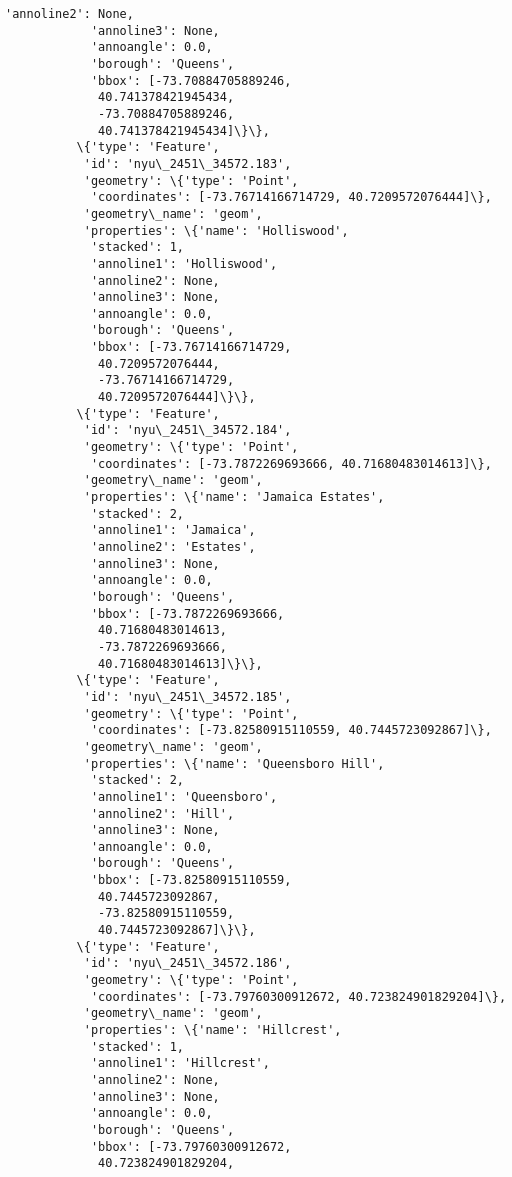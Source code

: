 \documentclass[11pt]{article}
\begin{document}
\begin{Verbatim}[commandchars=\\\{\}]
            'annoline2': None,
            'annoline3': None,
            'annoangle': 0.0,
            'borough': 'Queens',
            'bbox': [-73.70884705889246,
             40.741378421945434,
             -73.70884705889246,
             40.741378421945434]\}\},
          \{'type': 'Feature',
           'id': 'nyu\_2451\_34572.183',
           'geometry': \{'type': 'Point',
            'coordinates': [-73.76714166714729, 40.7209572076444]\},
           'geometry\_name': 'geom',
           'properties': \{'name': 'Holliswood',
            'stacked': 1,
            'annoline1': 'Holliswood',
            'annoline2': None,
            'annoline3': None,
            'annoangle': 0.0,
            'borough': 'Queens',
            'bbox': [-73.76714166714729,
             40.7209572076444,
             -73.76714166714729,
             40.7209572076444]\}\},
          \{'type': 'Feature',
           'id': 'nyu\_2451\_34572.184',
           'geometry': \{'type': 'Point',
            'coordinates': [-73.7872269693666, 40.71680483014613]\},
           'geometry\_name': 'geom',
           'properties': \{'name': 'Jamaica Estates',
            'stacked': 2,
            'annoline1': 'Jamaica',
            'annoline2': 'Estates',
            'annoline3': None,
            'annoangle': 0.0,
            'borough': 'Queens',
            'bbox': [-73.7872269693666,
             40.71680483014613,
             -73.7872269693666,
             40.71680483014613]\}\},
          \{'type': 'Feature',
           'id': 'nyu\_2451\_34572.185',
           'geometry': \{'type': 'Point',
            'coordinates': [-73.82580915110559, 40.7445723092867]\},
           'geometry\_name': 'geom',
           'properties': \{'name': 'Queensboro Hill',
            'stacked': 2,
            'annoline1': 'Queensboro',
            'annoline2': 'Hill',
            'annoline3': None,
            'annoangle': 0.0,
            'borough': 'Queens',
            'bbox': [-73.82580915110559,
             40.7445723092867,
             -73.82580915110559,
             40.7445723092867]\}\},
          \{'type': 'Feature',
           'id': 'nyu\_2451\_34572.186',
           'geometry': \{'type': 'Point',
            'coordinates': [-73.79760300912672, 40.723824901829204]\},
           'geometry\_name': 'geom',
           'properties': \{'name': 'Hillcrest',
            'stacked': 1,
            'annoline1': 'Hillcrest',
            'annoline2': None,
            'annoline3': None,
            'annoangle': 0.0,
            'borough': 'Queens',
            'bbox': [-73.79760300912672,
             40.723824901829204,

\end{Verbatim}
\end{document}
